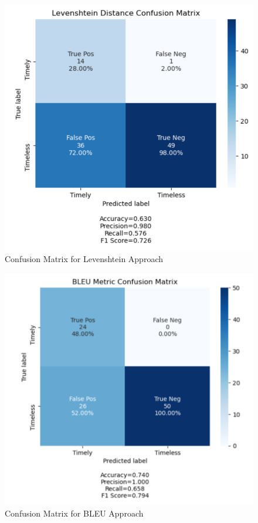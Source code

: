 \documentclass{article}
\begin{document}
\begin{figure}[t!]
	\begin{center}
		\includegraphics[scale=0.5]{leven.PNG}
	\end{center}
	\caption{Confusion Matrix for Levenshtein Approach}
	\label{fig:confusion_leven}
\end{figure}


\begin{figure}[t!]
	\begin{center}
		\includegraphics[scale=0.5]{bleu.PNG}
	\end{center}
	\caption{Confusion Matrix for BLEU Approach}
	\label{fig:confusion_bleu}
\end{figure}
\end{document}
